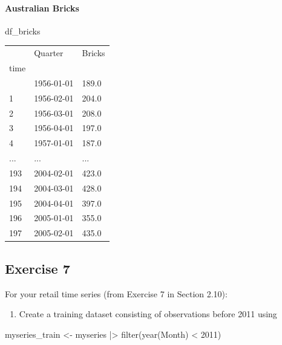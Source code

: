 \documentclass[
  11pt,
]{article}
\let\oldparagraph\paragraph
\renewcommand{\paragraph}[1]{\oldparagraph{#1}\mbox{}}
\newenvironment{Shaded}{\begin{snugshade}}{\end{snugshade}}
\newcommand{\NormalTok}[1]{\textcolor[rgb]{0.00,0.23,0.31}{#1}}
\providecommand{\tightlist}{%
  \setlength{\itemsep}{0pt}\setlength{\parskip}{0pt}}\usepackage{longtable,booktabs,array}
\begin{document}
\paragraph{Australian Bricks}\label{australian-bricks}

\begin{Shaded}
\begin{Highlighting}[]
\NormalTok{df\_bricks}
\end{Highlighting}
\end{Shaded}

\begin{longtable}[]{@{}lll@{}}
\toprule\noalign{}
& Quarter & Bricks \\
time & & \\
\midrule\noalign{}
\endhead
\bottomrule\noalign{}
\endlastfoot
0 & 1956-01-01 & 189.0 \\
1 & 1956-02-01 & 204.0 \\
2 & 1956-03-01 & 208.0 \\
3 & 1956-04-01 & 197.0 \\
4 & 1957-01-01 & 187.0 \\
... & ... & ... \\
193 & 2004-02-01 & 423.0 \\
194 & 2004-03-01 & 428.0 \\
195 & 2004-04-01 & 397.0 \\
196 & 2005-01-01 & 355.0 \\
197 & 2005-02-01 & 435.0 \\
\end{longtable}

\subsection{Exercise 7}\label{exercise-7}

For your retail time series (from Exercise 7 in Section 2.10):

\begin{enumerate}
\def\labelenumi{\alph{enumi}.}
\tightlist
\item
  Create a training dataset consisting of observations before 2011 using
\end{enumerate}

\begin{Shaded}
\begin{Highlighting}[]
\NormalTok{myseries\_train \textless{}{-} myseries |\textgreater{}}
\NormalTok{  filter(year(Month) \textless{} 2011)}
\end{Highlighting}
\end{Shaded}
\end{document}
